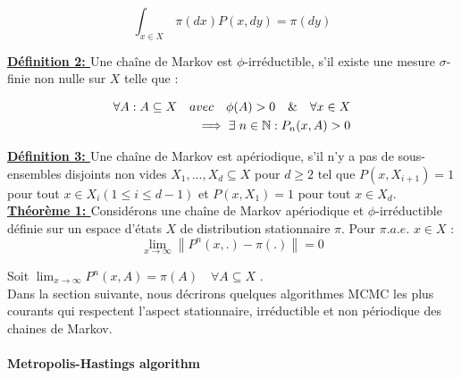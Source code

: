 \begin{equation}
	\int_{x \in X}^{}  \,\pi(dx)P(x,dy) = \pi(dy)
\end{equation}

\noindent \textbf{\underline{Définition 2: }} Une chaîne de Markov est \(\displaystyle \phi \)-irréductible, s'il existe une mesure \(\displaystyle \sigma\)-finie non nulle sur \(\displaystyle X \) telle que :

\begin{equation}
	\begin{split}
	\forall A :  A \subseteq X \hspace{1em} avec \hspace{1em} \phi(A) > 0  \hspace{1em} \&  \hspace{1em} \forall x \in X \\
	\implies \exists \hspace{0.3em} n \in \mathbb{N} : P_{n}(x,A) > 0
	\end{split}
\end{equation}

\noindent \textbf{\underline{Définition 3: }} Une chaîne de Markov est apériodique, s'il n'y a pas de sous-ensembles disjoints non vides \(\displaystyle X_{1},...,X_{d} \subseteq X\) pour \(\displaystyle d \geq 2\) tel que \(\displaystyle P(x,X_{i+1}) = 1\) pour tout \(\displaystyle x \in X_{i} (1\leq i \leq d-1 ) \) et \(\displaystyle P(x,X_{1}) = 1 \) pour tout \(\displaystyle x \in X_{d}\). \\

\noindent \textbf{\underline{Théorème 1: }} Considérons une chaîne de Markov apériodique et \(\displaystyle \phi \)-irréductible définie sur un espace d'états \(\displaystyle X \) de distribution stationnaire \(\displaystyle \pi \). Pour \(\displaystyle \pi.a.e. \) \(\displaystyle x \in X \) :
\begin{equation}
	\lim_{x \to \infty} \left\lVert P^{n}(x,.) - \pi(.) \right\rVert = 0
\end{equation} 

Soit \(\displaystyle \lim_{x \to \infty} P^{n}(x,A) = \pi(A) \hspace{1em} \forall A \subseteq  X \) . \\
Dans la section suivante, nous décrirons quelques algorithmes MCMC les plus courants qui respectent l’aspect stationnaire, irréductible et non périodique des chaines de Markov.
\paragraph{Metropolis-Hastings algorithm}
